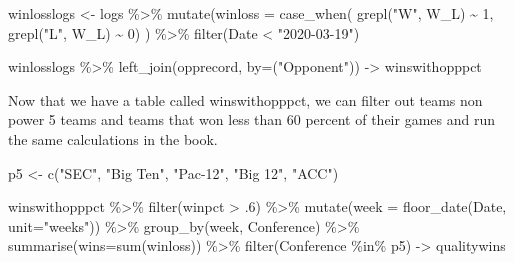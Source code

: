 \documentclass[
]{book}
\newenvironment{Shaded}{\begin{snugshade}}{\end{snugshade}}
\newcommand{\AttributeTok}[1]{\textcolor[rgb]{0.77,0.63,0.00}{#1}}
\newcommand{\DecValTok}[1]{\textcolor[rgb]{0.00,0.00,0.81}{#1}}
\newcommand{\FunctionTok}[1]{\textcolor[rgb]{0.00,0.00,0.00}{#1}}
\newcommand{\NormalTok}[1]{#1}
\newcommand{\OtherTok}[1]{\textcolor[rgb]{0.56,0.35,0.01}{#1}}
\newcommand{\SpecialCharTok}[1]{\textcolor[rgb]{0.00,0.00,0.00}{#1}}
\newcommand{\StringTok}[1]{\textcolor[rgb]{0.31,0.60,0.02}{#1}}
\begin{document}
\begin{Shaded}
\begin{Highlighting}[]
\NormalTok{winlosslogs }\OtherTok{\textless{}{-}}\NormalTok{ logs }\SpecialCharTok{\%\textgreater{}\%} \FunctionTok{mutate}\NormalTok{(}\AttributeTok{winloss =} \FunctionTok{case\_when}\NormalTok{(}
  \FunctionTok{grepl}\NormalTok{(}\StringTok{"W"}\NormalTok{, W\_L) }\SpecialCharTok{\textasciitilde{}} \DecValTok{1}\NormalTok{, }
  \FunctionTok{grepl}\NormalTok{(}\StringTok{"L"}\NormalTok{, W\_L) }\SpecialCharTok{\textasciitilde{}} \DecValTok{0}\NormalTok{)}
\NormalTok{) }\SpecialCharTok{\%\textgreater{}\%} \FunctionTok{filter}\NormalTok{(Date }\SpecialCharTok{\textless{}} \StringTok{"2020{-}03{-}19"}\NormalTok{)}
\end{Highlighting}
\end{Shaded}

\begin{Shaded}
\begin{Highlighting}[]
\NormalTok{winlosslogs }\SpecialCharTok{\%\textgreater{}\%} \FunctionTok{left\_join}\NormalTok{(opprecord, }\AttributeTok{by=}\NormalTok{(}\StringTok{"Opponent"}\NormalTok{)) }\OtherTok{{-}\textgreater{}}\NormalTok{ winswithopppct}
\end{Highlighting}
\end{Shaded}

Now that we have a table called winswithopppct, we can filter out teams non power 5 teams and teams that won less than 60 percent of their games and run the same calculations in the book.

\begin{Shaded}
\begin{Highlighting}[]
\NormalTok{p5 }\OtherTok{\textless{}{-}} \FunctionTok{c}\NormalTok{(}\StringTok{"SEC"}\NormalTok{, }\StringTok{"Big Ten"}\NormalTok{, }\StringTok{"Pac{-}12"}\NormalTok{, }\StringTok{"Big 12"}\NormalTok{, }\StringTok{"ACC"}\NormalTok{)}
\end{Highlighting}
\end{Shaded}

\begin{Shaded}
\begin{Highlighting}[]
\NormalTok{winswithopppct }\SpecialCharTok{\%\textgreater{}\%} \FunctionTok{filter}\NormalTok{(winpct }\SpecialCharTok{\textgreater{}}\NormalTok{ .}\DecValTok{6}\NormalTok{) }\SpecialCharTok{\%\textgreater{}\%} \FunctionTok{mutate}\NormalTok{(}\AttributeTok{week =} \FunctionTok{floor\_date}\NormalTok{(Date, }\AttributeTok{unit=}\StringTok{"weeks"}\NormalTok{)) }\SpecialCharTok{\%\textgreater{}\%} \FunctionTok{group\_by}\NormalTok{(week, Conference) }\SpecialCharTok{\%\textgreater{}\%} \FunctionTok{summarise}\NormalTok{(}\AttributeTok{wins=}\FunctionTok{sum}\NormalTok{(winloss)) }\SpecialCharTok{\%\textgreater{}\%} \FunctionTok{filter}\NormalTok{(Conference }\SpecialCharTok{\%in\%}\NormalTok{ p5) }\OtherTok{{-}\textgreater{}}\NormalTok{ qualitywins}
\end{Highlighting}
\end{Shaded}
\end{document}
